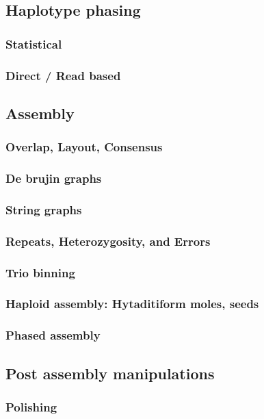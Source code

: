 \subsection{Haplotype phasing}
\subsubsection{Statistical}
\subsubsection{Direct / Read based}

\subsection{Assembly}
\subsubsection{Overlap, Layout, Consensus}
\subsubsection{De brujin graphs}
\subsubsection{String graphs}
\subsubsection{Repeats, Heterozygosity, and Errors}
\subsubsection{Trio binning}
\subsubsection{Haploid assembly: Hytaditiform moles, seeds}
\subsubsection{Phased assembly}


\subsection{Post assembly manipulations}
\subsubsection{Polishing}
